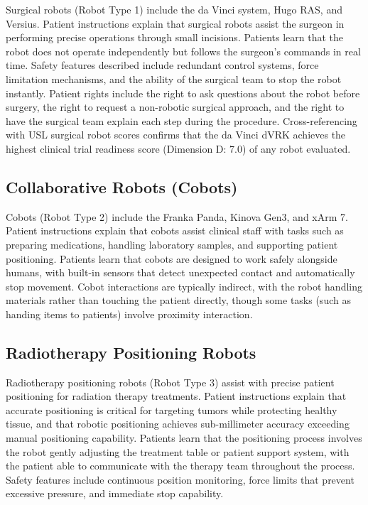 Surgical robots (Robot Type 1) include the da Vinci system, Hugo RAS, and
Versius. Patient instructions explain that surgical robots assist the surgeon
in performing precise operations through small incisions. Patients learn that
the robot does not operate independently but follows the surgeon's commands
in real time. Safety features described include redundant control systems,
force limitation mechanisms, and the ability of the surgical team to stop the
robot instantly. Patient rights include the right to ask questions about the
robot before surgery, the right to request a non-robotic surgical approach,
and the right to have the surgical team explain each step during the procedure.
Cross-referencing with USL surgical robot scores \cite{usl-standard} confirms
that the da Vinci dVRK achieves the highest clinical trial readiness score
(Dimension D: 7.0) of any robot evaluated.

\subsection{Collaborative Robots (Cobots)}
\label{subsec:instructions-cobots}

Cobots (Robot Type 2) include the Franka Panda, Kinova Gen3, and xArm 7.
Patient instructions explain that cobots assist clinical staff with tasks
such as preparing medications, handling laboratory samples, and supporting
patient positioning. Patients learn that cobots are designed to work safely
alongside humans, with built-in sensors that detect unexpected contact and
automatically stop movement. Cobot interactions are typically indirect, with
the robot handling materials rather than touching the patient directly, though
some tasks (such as handing items to patients) involve proximity interaction.

\subsection{Radiotherapy Positioning Robots}
\label{subsec:instructions-rt-positioning}

Radiotherapy positioning robots (Robot Type 3) assist with precise patient
positioning for radiation therapy treatments. Patient instructions explain that
accurate positioning is critical for targeting tumors while protecting healthy
tissue, and that robotic positioning achieves sub-millimeter accuracy exceeding
manual positioning capability. Patients learn that the positioning process
involves the robot gently adjusting the treatment table or patient support
system, with the patient able to communicate with the therapy team throughout
the process. Safety features include continuous position monitoring, force
limits that prevent excessive pressure, and immediate stop capability.

